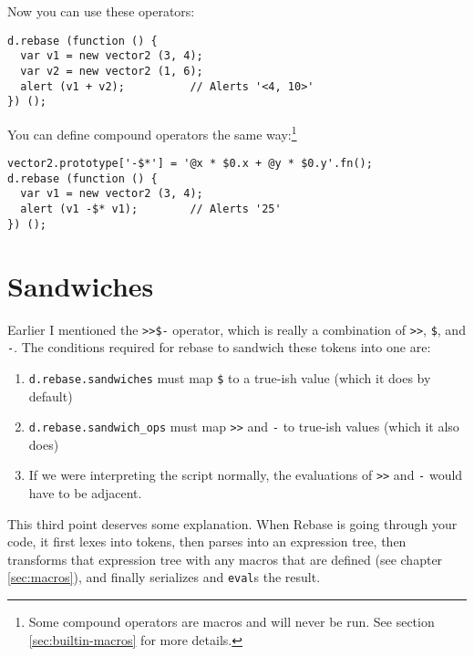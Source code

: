 \documentclass{report}
\begin{document}
      Now you can use these operators:

\begin{verbatim}
d.rebase (function () {
  var v1 = new vector2 (3, 4);
  var v2 = new vector2 (1, 6);
  alert (v1 + v2);          // Alerts '<4, 10>'
}) ();
\end{verbatim}

      You can define compound operators the same way:\footnote{Some compound operators are macros and will never be run. See section \ref{sec:builtin-macros} for more details.}

\begin{verbatim}
vector2.prototype['-$*'] = '@x * $0.x + @y * $0.y'.fn();
d.rebase (function () {
  var v1 = new vector2 (3, 4);
  alert (v1 -$* v1);        // Alerts '25'
}) ();
\end{verbatim}

\section {Sandwiches}
      \label{sec:sandwiches}
      Earlier I mentioned the \verb|>>$-| operator, which is really a combination of \verb|>>|, \verb|$|, and \verb|-|. The conditions required for rebase to sandwich these tokens into one
      are:

\begin{enumerate}
\item \verb|d.rebase.sandwiches| must map \verb|$| to a true-ish value (which it does by default)
\item \verb|d.rebase.sandwich_ops| must map \verb|>>| and \verb|-| to true-ish values (which it also does)
\item If we were interpreting the script normally, the evaluations of \verb|>>| and \verb|-| would have to be adjacent.
\end{enumerate}

      This third point deserves some explanation. When Rebase is going through your code, it first lexes into tokens, then parses into an expression tree, then transforms that expression tree
      with any macros that are defined (see chapter \ref{sec:macros}), and finally serializes and \verb|eval|s the result.
\end{document}
